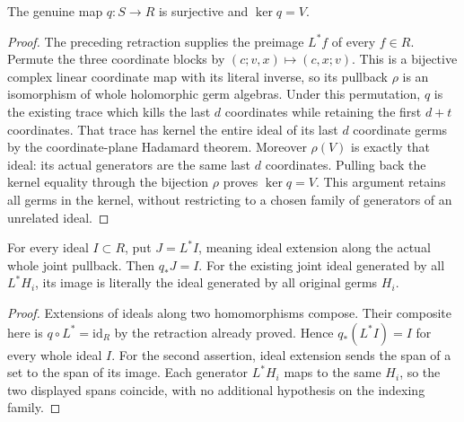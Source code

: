\begin{theorem}
\label{hir:tangent-displacement-zero-kernel}
\leanok
The genuine map $q:S\longrightarrow R$ is surjective and $\ker q=V$.
\end{theorem}
\begin{proof}
The preceding retraction supplies the preimage $L^*f$ of every $f\in R$.
Permute the three coordinate blocks by $(c;v,x)\mapsto(c,x;v)$.
This is a bijective complex linear coordinate map with its literal inverse,
so its pullback $\rho$ is an isomorphism of whole holomorphic germ algebras.
Under this permutation, $q$ is the existing trace which kills the last
$d$ coordinates while retaining the first $d+t$ coordinates. That trace
has kernel the entire ideal of its last $d$ coordinate germs by the
coordinate-plane Hadamard theorem. Moreover $\rho(V)$ is exactly that
ideal: its actual generators are the same last $d$ coordinates. Pulling
back the kernel equality through the bijection $\rho$ proves
$\ker q=V$. This argument retains all germs in the kernel, without
restricting to a chosen family of generators of an unrelated ideal.
\end{proof}

\begin{theorem}
\label{hir:tangent-displacement-zero-original-ideal}
\leanok
For every ideal $I\subset R$, put $J=L^*I$, meaning ideal extension
along the actual whole joint pullback. Then $q_*J=I$.
For the existing joint ideal generated by all $L^*H_i$, its image is
literally the ideal generated by all original germs $H_i$.
\end{theorem}
\begin{proof}
Extensions of ideals along two homomorphisms compose. Their composite
here is $q\circ L^*=\mathrm{id}_R$ by the retraction already proved.
Hence $q_*(L^*I)=I$ for every whole ideal $I$.
For the second assertion, ideal extension sends the span of a set to
the span of its image. Each generator $L^*H_i$ maps to the same $H_i$,
so the two displayed spans coincide, with no additional hypothesis on
the indexing family.
\end{proof}

